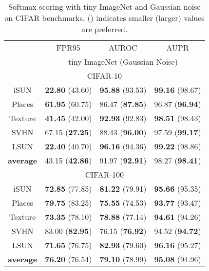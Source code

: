 \documentclass{article}
\begin{document}
\begin{table}[t]
\parbox{.47\linewidth}{
\centering
\caption{Softmax scoring with tiny-ImageNet and Gaussian noise on CIFAR benchmarks.  () indicates smaller (larger) values are preferred.} \label{tab: softmax tiny}
\vspace{5pt}
\scriptsize
{
\begin{tabular}{c|ccc}
\toprule[1.5pt]
                   & FPR95      & AUROC        & AUPR       \\
                   \cline{2-4} 
\multirow{-2}{*}{} & \multicolumn{3}{c}{tiny-ImageNet (Gaussian Noise)} \\
\midrule[0.6pt]
\multicolumn{4}{c}{\cellcolor{greyL}CIFAR-10} \\
\midrule[0.6pt]
iSUN               & \textbf{22.80} (43.60) & \textbf{95.88} (93.53) & \textbf{99.16} (98.67) \\ 
Places        & \textbf{61.95} (60.75) & {86.47} (\textbf{87.85}) & {96.87} (\textbf{96.94}) \\
Texture            & \textbf{41.45} (42.00) & \textbf{92.93} (92.83) & \textbf{98.51} (98.43) \\
SVHN               & {67.15} (\textbf{27.25}) & {88.43} (\textbf{96.00}) & {97.59} (\textbf{99.17}) \\
LSUN             & \textbf{22.40} (40.70) & \textbf{96.16} (94.36) & \textbf{99.22} (98.86) \\
\midrule
\textbf{average}   & {43.15} (\textbf{42.86}) & {91.97} (\textbf{92.91}) & {98.27} (\textbf{98.41}) \\ \midrule[1pt]
\multicolumn{4}{c}{\cellcolor{greyL}CIFAR-100} \\
\midrule[1pt]
iSUN               & \textbf{72.85} (77.85) & \textbf{81.22} (79.91) & \textbf{95.66} (95.35) \\ 
Places        & \textbf{79.75} (83.25) & \textbf{75.55} (74.53) & \textbf{93.77} (93.47) \\
Texture            & \textbf{73.35} (78.10) & \textbf{78.88} (77.14) & \textbf{94.61} (94.26) \\
SVHN               & {83.00} (\textbf{82.95}) & {76.15} (\textbf{76.92}) & {94.52} (\textbf{94.72}) \\
LSUN               & \textbf{71.65} (76.75) & \textbf{82.93} (79.60) & \textbf{96.16} (95.27) \\
\midrule
\textbf{average}   & \textbf{76.20} (76.54) & \textbf{79.10} (78.99) & \textbf{95.08} (94.96) \\ \bottomrule[1.5pt]      
\end{tabular}
}}
\end{table}
\end{document}
